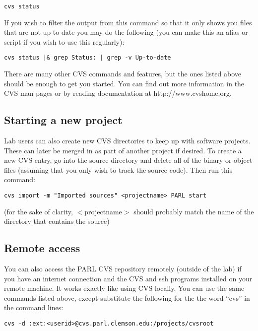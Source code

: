 \documentclass[11pt, letterpaper]{article}
\begin{document}
\begin{itemize}
\begin{verbatim}
cvs status
\end{verbatim}

	If you wish to filter the output from this command so that it only
	shows you files that are not up to date you may do the following
	(you can make this an alias or script if you wish to use this
	regularly):

\begin{verbatim}
cvs status |& grep Status: | grep -v Up-to-date 
\end{verbatim}

\end{itemize}

There are many other CVS commands and features, but the ones listed
above should be enough to get you started.  You can find out more
information in the CVS man pages or by reading documentation at
http://www.cvshome.org.

\subsection{Starting a new project}

Lab users can also create new CVS directories to keep up with 
software projects.  These can later be merged in as part of another
project if desired.  To create a new CVS entry, go into the source
directory and delete all of the binary or object files (assuming that
you only wish to track the source code).  Then run this command:

\begin{verbatim}
cvs import -m "Imported sources" <projectname> PARL start
\end{verbatim}

(for the sake of clarity, $<$projectname$>$ should probably match the name of the directory that
contains the source)  

\subsection{Remote access}

You can also access the PARL CVS repository remotely (outside of the
lab) if you have an internet connection and the CVS and ssh programs
installed on your remote machine.  It works exactly like using CVS
locally.  You can use the same commands listed above, except substitute
the following for the the word ``cvs'' in the command lines:

\begin{verbatim}
cvs -d :ext:<userid>@cvs.parl.clemson.edu:/projects/cvsroot
\end{verbatim}
\end{document}
